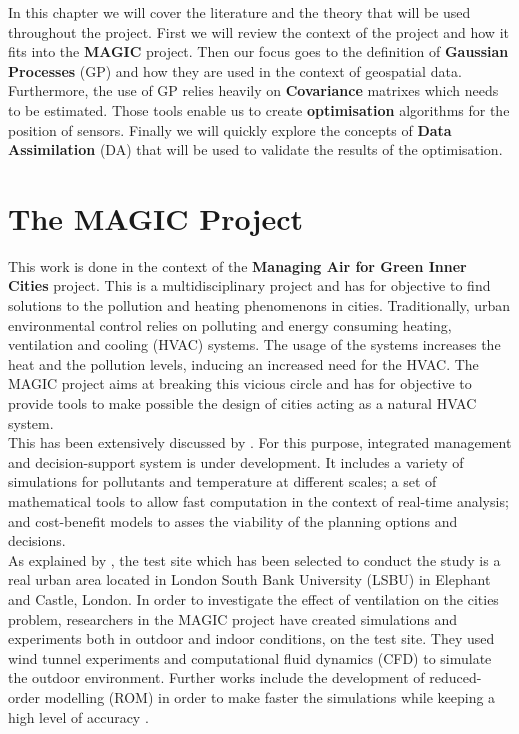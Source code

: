 \documentclass[12pt,twoside]{report}
\begin{document}
In this chapter we will cover the literature and the theory that will be used throughout the project. First we will review the context of the project and how it fits into the \textbf{MAGIC} project. Then our focus goes to the definition of \textbf{Gaussian Processes} (GP) and how they are used in the context of geospatial data. Furthermore, the use of GP relies heavily on \textbf{Covariance} matrixes which needs to be estimated. Those tools enable us to create \textbf{optimisation} algorithms for the position of sensors. Finally we will quickly explore the concepts of \textbf{Data Assimilation} (DA) that will be used to validate the results of the optimisation. 

\section{The MAGIC Project}

This work is done in the context of the \textbf{Managing Air for Green Inner Cities} project. This is a multidisciplinary project and has for objective to find solutions to the pollution and heating phenomenons in cities. Traditionally, urban environmental control relies on polluting and energy consuming heating, ventilation and cooling (HVAC) systems. The usage of the systems increases the heat and the pollution levels, inducing an increased need for the HVAC. The MAGIC project aims at breaking this vicious circle and has for objective to provide tools to make possible the design of cities acting as a natural HVAC system. \\


This has been extensively discussed by  \cite{song_natural_2018}.  For this purpose, integrated management and decision-support system is under development. It includes a variety of simulations for pollutants and temperature at different scales; a set of mathematical tools to allow fast computation in the context of real-time analysis; and cost-benefit models to asses the viability of the planning options and decisions. \\

As explained by \cite{song_natural_2018}, the test site which has been selected to conduct the study is a real urban area located in London South Bank University (LSBU) in  Elephant and Castle, London. In order to investigate the effect of ventilation on the cities problem, researchers in the MAGIC project have created simulations and experiments both in outdoor and indoor conditions, on the test site. They used wind tunnel experiments and computational fluid dynamics (CFD) to simulate the outdoor environment. Further works include the development of reduced-order modelling (ROM) in order to make faster the simulations while keeping a high level of accuracy \citep{arcucci_effective_2018}. \\
\end{document}
